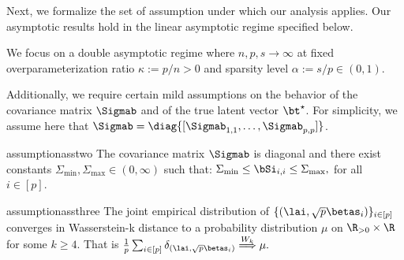 
\vp
Next, we formalize the set of assumption under which our analysis applies. Our asymptotic results hold in the linear asymptotic regime specified below.
\begin{assumption}\label{ass:linear} We focus on a double asymptotic regime where $n,p,s\rightarrow\infty$ at fixed overparameterization ratio $\kappa:=p/n>0$ and sparsity level $\alpha:=s/p\in(0,1)$.  
\end{assumption}

%
Additionally, we require certain mild assumptions on the behavior of the covariance matrix $\Sigmab$ and of the true latent vector $\bt^\star$. For simplicity, we assume here that $\Sigmab = \diag{[\Sigmab_{1,1},\ldots,\Sigmab_{p,p}]}$.%

\begin{restatable}{assumption}{asstwo}\label{ass:inv} {The covariance matrix $\Sigmab$ is diagonal} and there exist constants $\Sigma_{\min},\Sigma_{\max}\in(0,\infty)$ such that:
$
\Sigma_{\min}\leq\bSi_{i,i}\leq \Sigma_{\max},
$
for all $i\in[p].$
\end{restatable}


\begin{restatable}{assumption}{assthree}\label{ass:mu}
The joint empirical distribution of $\{(\lai,\sqrt{p}\betas_i)\}_{i\in[p]}$ converges in {Wasserstein-k} distance to a probability distribution $\mu$ on $\R_{>0}\times\R$ {for some {$k\geq 4$}}. That is
$
\frac{1}{p}\sum_{i\in[p]}\delta_{(\lai,\sqrt{p}\betas_i)} \stackrel{W_k}{\Longrightarrow} \mu.
$
\end{restatable}

